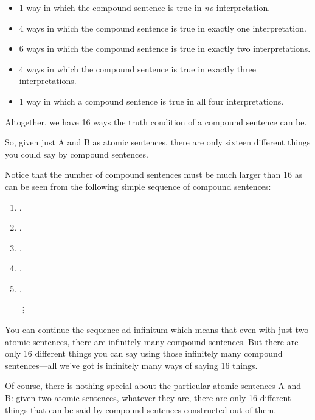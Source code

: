 \begin{itemize}
 \item 1 way in which the compound sentence is true in \emph{no} interpretation.
 \item 4 ways in which the compound sentence is true in exactly one interpretation.
 \item 6 ways in which the compound sentence is true in exactly two interpretations.
 \item 4 ways in which the compound sentence is true in exactly three 
  interpretations.
 \item 1 way in which a compound sentence is true in all four interpretations.
\end{itemize}

 Altogether, we have 16 ways the truth condition of a compound sentence 
  can be.


So, given just A and B as atomic sentences,   there are only sixteen different 
things you could say by compound sentences.

Notice that the number of compound sentences must be much larger than 16 as can 
be seen from the following simple sequence of compound sentences:

\begin{enumerate}

 \item {}.

 \item {}.

 \item {}.

\item {}.

\item {}.
 
\item[\vdots]

\end{enumerate}

You can continue the sequence ad infinitum which means that even with just two 
atomic sentences, there are infinitely many compound sentences. But there are 
only 16 different things you can say using those infinitely many compound 
sentences---all we've got is infinitely many ways of saying 16 things.


Of course, there is nothing special about the particular atomic sentences A and 
B: given two atomic sentences, whatever they are, there are only 16 different 
things that can be said by compound sentences constructed out of them.





